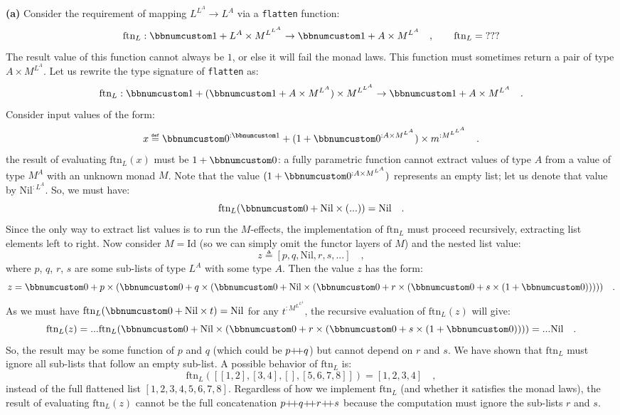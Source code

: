 \textbf{(a)} Consider the requirement of mapping $L^{L^{A}}\rightarrow L^{A}$
via a \lstinline!flatten! function:
\[
\text{ftn}_{L}:\bbnum 1+L^{A}\times M^{L^{L^{A}}}\rightarrow\bbnum 1+A\times M^{L^{A}}\quad,\quad\quad\text{ftn}_{L}=\text{???}
\]
The result value of this function cannot always be $1$, or else it
will fail the monad laws. This function must sometimes return a pair
of type $A\times M^{L^{A}}$. Let us rewrite the type signature of
\lstinline!flatten! as:
\[
\text{ftn}_{L}:\bbnum 1+(\bbnum 1+A\times M^{L^{A}})\times M^{L^{L^{A}}}\rightarrow\bbnum 1+A\times M^{L^{A}}\quad.
\]
Consider input values of the form:
\[
x\triangleq\bbnum 0^{:\bbnum 1}+(1+\bbnum 0^{:A\times M^{L^{A}}})\times m^{:M^{L^{L^{A}}}}\quad.
\]
the result of evaluating $\text{ftn}_{L}(x)$ must be $1+\bbnum 0$:
a fully parametric function cannot extract values of type $A$ from
a value of type $M^{A}$ with an unknown monad $M$. Note that the
value $(1+\bbnum 0^{:A\times M^{L^{A}}})$ represents an empty list;
let us denote that value by $\text{Nil}^{:L^{A}}$. So, we must have:
\[
\text{ftn}_{L}(\bbnum 0+\text{Nil}\times(...))=\text{Nil}\quad.
\]
Since the only way to extract list values is to run the $M$-effects,
the implementation of $\text{ftn}_{L}$ must proceed recursively,
extracting list elements left to right. Now consider $M=\text{Id}$
(so we can simply omit the functor layers of $M$) and the nested
list value:
\[
z\triangleq\left[p,q,\text{Nil},r,s,...\right]\quad,
\]
 where $p$, $q$, $r$, $s$ are some sub-lists of type $L^{A}$
with some type $A$. Then the value $z$ has the form:
\[
z=\bbnum 0+p\times(\bbnum 0+q\times(\bbnum 0+\text{Nil}\times(\bbnum 0+r\times(\bbnum 0+s\times(1+\bbnum 0)))))\quad.
\]
As we must have $\text{ftn}_{L}(\bbnum 0+\text{Nil}\times t)=\text{Nil}$
for any $t^{:M^{L^{L^{A}}}}$, the recursive evaluation of $\text{ftn}_{L}(z)$
will give:
\[
\text{ftn}_{L}(z)=...\text{ftn}_{L}(\bbnum 0+\text{Nil}\times(\bbnum 0+r\times(\bbnum 0+s\times(1+\bbnum 0))))=...\text{Nil}\quad.
\]
So, the result may be some function of $p$ and $q$ (which could
be $p{\displaystyle }{+\negmedspace+} q$) but cannot depend on $r$ and $s$. We have shown
that $\text{ftn}_{L}$ must ignore all sub-lists that follow an empty
sub-list. A possible behavior of $\text{ftn}_{L}$ is:
\[
\text{ftn}_{L}(\left[\left[1,2\right],\left[3,4\right],\left[\right],\left[5,6,7,8\right]\right])=\left[1,2,3,4\right]\quad,
\]
instead of the full flattened list $\left[1,2,3,4,5,6,7,8\right]$.
Regardless of how we implement $\text{ftn}_{L}$ (and whether it satisfies
the monad laws), the result of evaluating $\text{ftn}_{L}(z)$ cannot
be the full concatenation $p{\displaystyle }{+\negmedspace+} q{\displaystyle }{+\negmedspace+} r{\displaystyle }{+\negmedspace+} s$ because the
computation must ignore the sub-lists $r$ and $s$.


